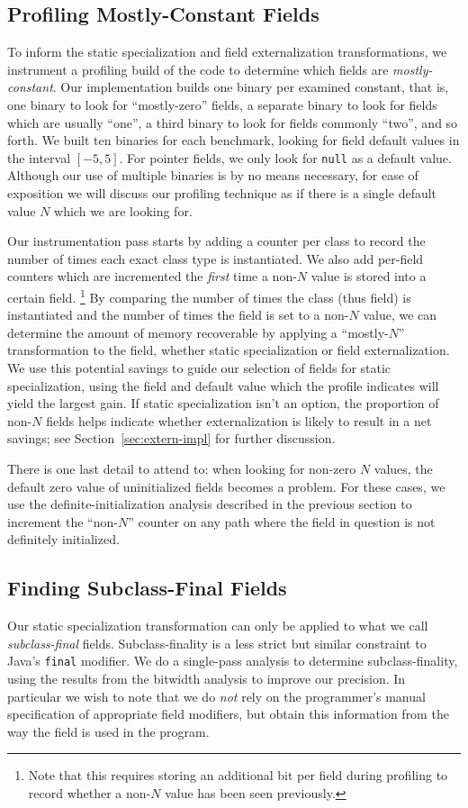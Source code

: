 \documentclass[oribibl]{llncs}
\begin{document}
\subsection{Profiling Mostly-Constant Fields}
To inform the static specialization and field externalization
transformations, we instrument a profiling build of the code
to determine which fields are {\it mostly-constant}.  Our implementation
builds one binary per examined constant, that is, one binary to look
for ``mostly-zero'' fields, a separate binary to look for fields which
are usually ``one'', a third binary to look for fields commonly
``two'', and so forth.  We built ten binaries for each benchmark, looking for
field default values in the interval $[-5,5]$.
For pointer fields, we only look for {\tt null} as a default value.
Although our use of multiple binaries is by no means necessary,
for ease of exposition we will discuss our profiling technique
as if there is a single default value $N$ which we are looking for.

Our instrumentation pass starts by
adding a counter per class
to record the number of times each exact class type is instantiated.
We also add per-field counters which are incremented the \emph{first}
time a non-$N$ value is stored into a certain field.%
\footnote{Note that this requires storing an additional bit per field
  during profiling
  to record whether a non-$N$ value has been seen previously.}
By comparing the
number of times the class (thus field) is instantiated and the number
of times the field is set to a non-$N$ value, we can determine the
amount of memory recoverable by applying a ``mostly-$N$''
transformation to the field, whether static specialization or field
externalization.  We use this potential savings to guide our selection
of fields for static specialization, using the field and default value
which the profile indicates will yield the largest gain.  If static
specialization isn't an option, the
proportion of non-$N$ fields helps indicate whether externalization is
likely to result in a net savings; see Section~\ref{sec:extern-impl}
for further discussion.

There is one last detail to attend to:  when looking for non-zero $N$
values, the default zero value of
uninitialized fields becomes a problem.  For these cases, we use the
definite-initialization analysis described in the previous section to
increment the
``non-$N$'' counter on any path where the field in question is not
definitely initialized.

\subsection{Finding Subclass-Final Fields}
\label{sec:subclass-final}
Our static specialization transformation can only be applied to what
we call {\it subclass-final} fields.  Subclass-finality is a less strict
but similar constraint to Java's {\tt final} modifier.  We do a
single-pass analysis to determine subclass-finality, using the results
from the bitwidth analysis to improve our precision.  In particular we
wish to note that we do {\it not} rely on the programmer's manual
specification of appropriate field modifiers, but obtain this
information from the way the field is used in the program.
\end{document}
